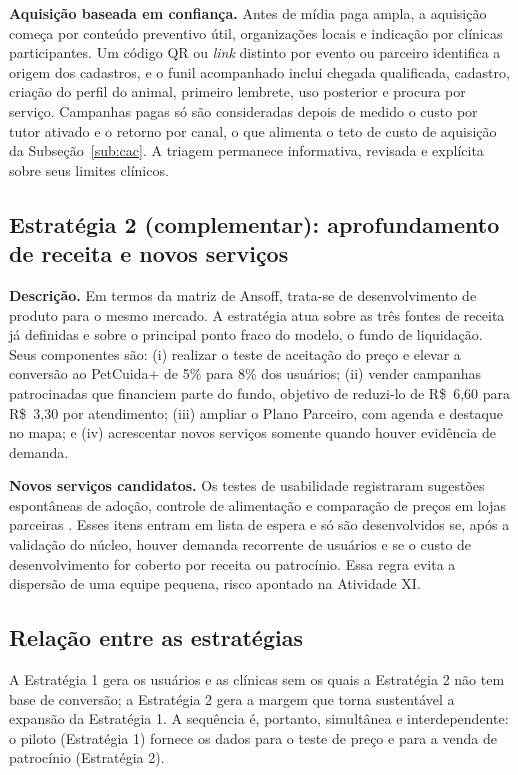 \textbf{Aquisição baseada em confiança.} Antes de mídia paga ampla, a aquisição começa por conteúdo preventivo útil, organizações locais e indicação por clínicas participantes. Um código QR ou \textit{link} distinto por evento ou parceiro identifica a origem dos cadastros, e o funil acompanhado inclui chegada qualificada, cadastro, criação do perfil do animal, primeiro lembrete, uso posterior e procura por serviço. Campanhas pagas só são consideradas depois de medido o custo por tutor ativado e o retorno por canal, o que alimenta o teto de custo de aquisição da Subseção~\ref{sub:cac}. A triagem permanece informativa, revisada e explícita sobre seus limites clínicos.

\subsection{Estratégia 2 (complementar): aprofundamento de receita e novos serviços}

\textbf{Descrição.} Em termos da matriz de Ansoff, trata-se de desenvolvimento de produto para o mesmo mercado. A estratégia atua sobre as três fontes de receita já definidas e sobre o principal ponto fraco do modelo, o fundo de liquidação. Seus componentes são: (i) realizar o teste de aceitação do preço e elevar a conversão ao PetCuida+ de 5\% para 8\% dos usuários; (ii) vender campanhas patrocinadas que financiem parte do fundo, objetivo de reduzi-lo de R\$~6,60 para R\$~3,30 por atendimento; (iii) ampliar o Plano Parceiro, com agenda e destaque no mapa; e (iv) acrescentar novos serviços somente quando houver evidência de demanda.

\textbf{Novos serviços candidatos.} Os testes de usabilidade registraram sugestões espontâneas de adoção, controle de alimentação e comparação de preços em lojas parceiras \cite{grupo2026a6}. Esses itens entram em lista de espera e só são desenvolvidos se, após a validação do núcleo, houver demanda recorrente de usuários e se o custo de desenvolvimento for coberto por receita ou patrocínio. Essa regra evita a dispersão de uma equipe pequena, risco apontado na Atividade XI.

\subsection{Relação entre as estratégias}

A Estratégia 1 gera os usuários e as clínicas sem os quais a Estratégia 2 não tem base de conversão; a Estratégia 2 gera a margem que torna sustentável a expansão da Estratégia 1. A sequência é, portanto, simultânea e interdependente: o piloto (Estratégia 1) fornece os dados para o teste de preço e para a venda de patrocínio (Estratégia 2).
